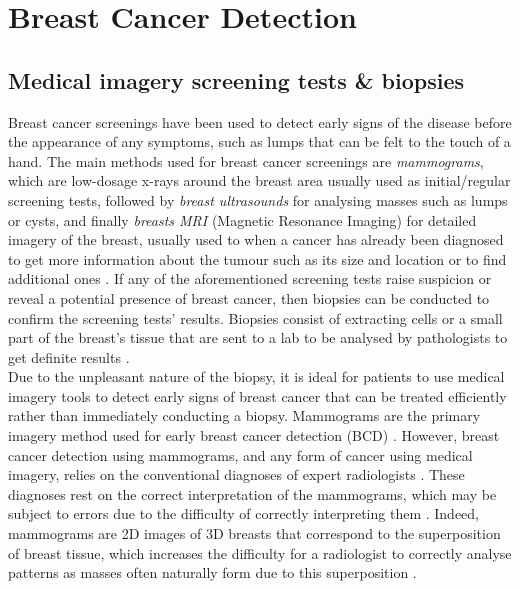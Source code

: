 
\section{Breast Cancer Detection}

\subsection{Medical imagery screening tests \& biopsies}
\label{sec:litreview-bcd-medical-imagery}

Breast cancer screenings have been used to detect early signs of the disease before the appearance of any symptoms, such as lumps that can be felt to the touch of a hand. The main methods used for breast cancer screenings are \textit{mammograms}, which are low-dosage x-rays around the breast area usually  used as initial/regular screening tests, followed by \textit{breast ultrasounds} for analysing masses such as lumps or cysts, and finally \textit{breasts MRI} (Magnetic Resonance Imaging) for detailed imagery of the breast, usually used to when a cancer has already been diagnosed to get more information about the tumour such as its size and location or to find additional ones \cite{americanCancerSociety2019}. If any of the aforementioned screening tests raise suspicion or reveal a potential presence of breast cancer, then biopsies can be conducted to confirm the screening tests' results. Biopsies consist of extracting cells or a small part of the breast's tissue that are sent to a lab to be analysed by pathologists to get definite results \cite{martin2019}.\\

Due to the unpleasant nature of the biopsy, it is ideal for patients to use medical imagery tools to detect early signs of breast cancer that can be treated efficiently rather than immediately conducting a biopsy. Mammograms are the primary imagery method used for early breast cancer detection (BCD) \cite{Ramos-Pollan2012}. However, breast cancer detection using mammograms, and any form of cancer using medical imagery, relies on the conventional diagnoses of expert radiologists \cite{Osareh2010}. These diagnoses rest on the correct interpretation of the mammograms, which may be subject to errors due to the difficulty of correctly interpreting them \cite{Elter2009}. Indeed, mammograms are 2D images of 3D breasts that correspond to the superposition of breast tissue, which increases the difficulty for a radiologist to correctly analyse patterns as masses often naturally form due to this superposition \cite{Elter2009}.


